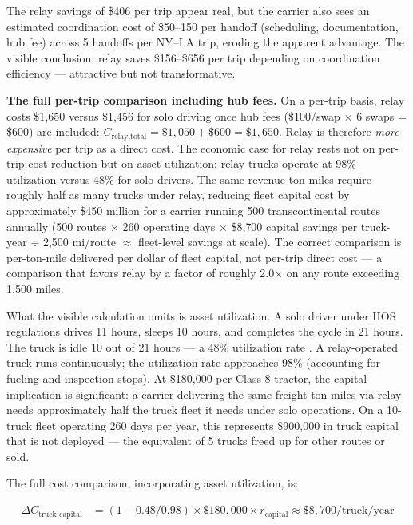The relay savings of \$406 per trip appear real, but the carrier also sees an estimated coordination cost of \$50--150 per handoff (scheduling, documentation, hub fee) across 5 handoffs per NY--LA trip, eroding the apparent advantage. The visible conclusion: relay saves \$156--\$656 per trip depending on coordination efficiency --- attractive but not transformative.

\medskip
\noindent\textbf{The full per-trip comparison including hub fees.}
On a per-trip basis, relay costs \$1,650 versus \$1,456 for solo driving once hub fees (\$100/swap $\times$ 6 swaps = \$600) are included: $C_{\text{relay,total}} = \$1{,}050 + \$600 = \$1{,}650$. Relay is therefore \textit{more expensive} per trip as a direct cost. The economic case for relay rests not on per-trip cost reduction but on asset utilization: relay trucks operate at 98\% utilization versus 48\% for solo drivers. The same revenue ton-miles require roughly half as many trucks under relay, reducing fleet capital cost by approximately \$450 million for a carrier running 500 transcontinental routes annually (500 routes $\times$ 260 operating days $\times$ \$8{,}700 capital savings per truck-year $\div$ 2,500 mi/route $\approx$ fleet-level savings at scale). The correct comparison is per-ton-mile delivered per dollar of fleet capital, not per-trip direct cost --- a comparison that favors relay by a factor of roughly 2.0$\times$ on any route exceeding 1,500 miles.

What the visible calculation omits is asset utilization. A solo driver under HOS regulations drives 11 hours, sleeps 10 hours, and completes the cycle in 21 hours. The truck is idle 10 out of 21 hours --- a 48\% utilization rate \citep{FMCSA_HOS2022}. A relay-operated truck runs continuously; the utilization rate approaches 98\% (accounting for fueling and inspection stops). At \$180,000 per Class 8 tractor, the capital implication is significant: a carrier delivering the same freight-ton-miles via relay needs approximately half the truck fleet it needs under solo operations. On a 10-truck fleet operating 260 days per year, this represents \$900,000 in truck capital that is not deployed --- the equivalent of 5 trucks freed up for other routes or sold.

The full cost comparison, incorporating asset utilization, is:

\begin{align*}
\Delta C_{\text{truck capital}} &= (1 - 0.48/0.98) \times \$180{,}000 \times r_{\text{capital}} \approx \$8{,}700/\text{truck/year}
\end{align*}

